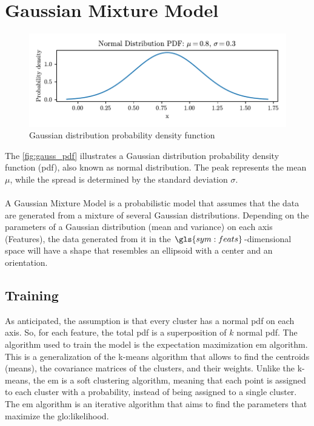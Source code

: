 \section{Gaussian Mixture Model}
\label{sec:gaussian}

\begin{figure}
    \centering
    \includegraphics{images/Gaussian/Figure_3.pdf}
    \caption{Gaussian distribution probability density function}
    \label{fig:gauss_pdf}
\end{figure}

The \autoref{fig:gauss_pdf} illustrates a Gaussian distribution probability density function (\gls{pdf}), also known as normal distribution. The peak represents the mean $\mu$, while the spread is determined by the standard deviation $\sigma$.

\paragraph*{}
A Gaussian Mixture Model is a probabilistic model that assumes that the data are generated from a mixture of several Gaussian distributions. Depending on the parameters of a Gaussian distribution (mean and variance) on each axis (Features), the data generated from it in the $\gls{sym:feats}$-dimensional space will have a shape that resembles an ellipsoid with a center and an orientation.


\subsection{Training}
\label{sec:gauss_train}
As anticipated, the assumption is that every cluster has a normal \gls{pdf} on each axis. So, for each feature, the total \gls{pdf} is a superposition of $k$ normal \gls{pdf}. 
The algorithm used to train the model is the expectation maximization \gls{em} algorithm. This is a generalization of the k-means algorithm that allows to find the centroids (means), the covariance matrices of the clusters, and their weights. Unlike the k-means, the \gls{em} is a soft clustering algorithm, meaning that each point is assigned to each cluster with a probability, instead of being assigned to a single cluster.
The \gls{em} algorithm is an iterative algorithm that aims to find the parameters that maximize the \gls{glo:likelihood}.

